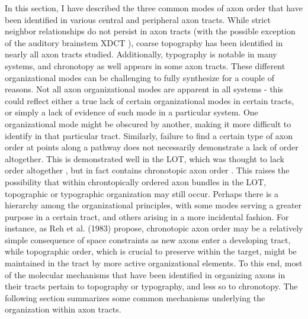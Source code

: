 In this section, I have described the three common modes of axon order that have been identified in various central and peripheral axon tracts.
While strict neighbor relationships do not persist in axon tracts (with the possible exception of the auditory brainstem XDCT \cite{kashima2013pre}), coarse topography has been identified in nearly all axon tracts studied.
Additionally, typography is notable in many systems, and chronotopy as well appears in some axon tracts.
These different organizational modes can be challenging to fully synthesize for a couple of reasons.
Not all axon organizational modes are apparent in all systems - this could reflect either a true lack of certain organizational modes in certain tracts, or simply a lack of evidence of such mode in a particular system.
One organizational mode might be obscured by another, making it more difficult to identify in that particular tract.
Similarly, failure to find a certain type of axon order at points along a pathway does not necessarily demonstrate a lack of order altogether.
This is demonstrated well in the LOT, which was thought to lack order altogether \cite{price1975observation}, but in fact contains chronotopic axon order \cite{yamatani2004chronotopic}.
This raises the possibility that within chrontopically ordered axon bundles in the LOT, topographic or typographic organization may still occur.
Perhaps there is a hierarchy among the organizational principles, with some modes serving a greater purpose in a certain tract, and others arising in a more incidental fashion.
For instance, as Reh et al. (1983) propose, chronotopic axon order may be a relatively simple consequence of space constraints as new axons enter a developing tract, while topographic order, which is crucial to preserve within the target, might be maintained in the tract by more active organizational elements.
To this end, most of the molecular mechanisms that have been identified in organizing axons in their tracts pertain to topography or typography, and less so to chronotopy.
The following section summarizes some common mechanisms underlying the organization within axon tracts.